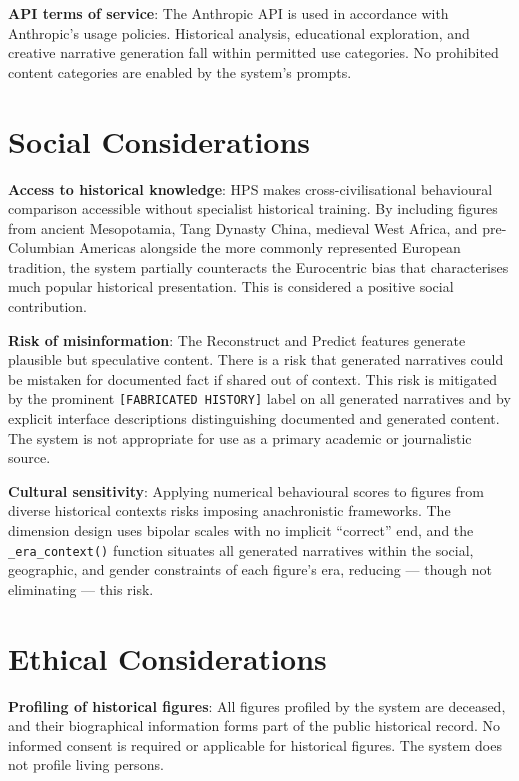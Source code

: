 \documentclass[11pt, a4paper]{report}
\begin{document}
\textbf{API terms of service}: The Anthropic API is used in accordance with Anthropic's usage policies. Historical analysis, educational exploration, and creative narrative generation fall within permitted use categories. No prohibited content categories are enabled by the system's prompts.

\section{Social Considerations}

\textbf{Access to historical knowledge}: HPS makes cross-civilisational behavioural comparison accessible without specialist historical training. By including figures from ancient Mesopotamia, Tang Dynasty China, medieval West Africa, and pre-Columbian Americas alongside the more commonly represented European tradition, the system partially counteracts the Eurocentric bias that characterises much popular historical presentation. This is considered a positive social contribution.

\textbf{Risk of misinformation}: The Reconstruct and Predict features generate plausible but speculative content. There is a risk that generated narratives could be mistaken for documented fact if shared out of context. This risk is mitigated by the prominent \texttt{[FABRICATED HISTORY]} label on all generated narratives and by explicit interface descriptions distinguishing documented and generated content. The system is not appropriate for use as a primary academic or journalistic source.

\textbf{Cultural sensitivity}: Applying numerical behavioural scores to figures from diverse historical contexts risks imposing anachronistic frameworks. The dimension design uses bipolar scales with no implicit ``correct'' end, and the \texttt{\_era\_context()} function situates all generated narratives within the social, geographic, and gender constraints of each figure's era, reducing — though not eliminating — this risk.

\section{Ethical Considerations}

\textbf{Profiling of historical figures}: All figures profiled by the system are deceased, and their biographical information forms part of the public historical record. No informed consent is required or applicable for historical figures. The system does not profile living persons.
\end{document}
